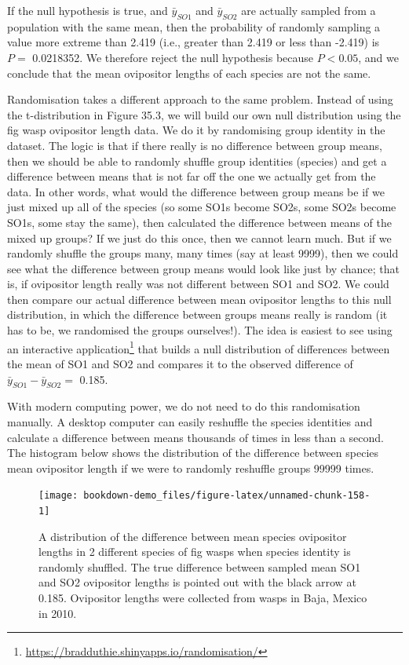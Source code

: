 \documentclass[
  openany]{krantz}
\begin{document}
If the null hypothesis is true, and \(\bar{y}_{SO1}\) and \(\bar{y}_{SO2}\) are actually sampled from a population with the same mean, then the probability of randomly sampling a value more extreme than 2.419 (i.e., greater than 2.419 or less than -2.419) is \(P =\) 0.0218352.
We therefore reject the null hypothesis because \(P < 0.05\), and we conclude that the mean ovipositor lengths of each species are not the same.

Randomisation takes a different approach to the same problem.
Instead of using the t-distribution in Figure 35.3, we will build our own null distribution using the fig wasp ovipositor length data.
We do it by randomising group identity in the dataset.
The logic is that if there really is no difference between group means, then we should be able to randomly shuffle group identities (species) and get a difference between means that is not far off the one we actually get from the data.
In other words, what would the difference between group means be if we just mixed up all of the species (so some SO1s become SO2s, some SO2s become SO1s, some stay the same), then calculated the difference between means of the mixed up groups?
If we just do this once, then we cannot learn much.
But if we randomly shuffle the groups many, many times (say at least 9999), then we could see what the difference between group means would look like just by chance; that is, if ovipositor length really was not different between SO1 and SO2.
We could then compare our actual difference between mean ovipositor lengths to this null distribution, in which the difference between groups means really is random (it has to be, we randomised the groups ourselves!).
The idea is easiest to see using an interactive application\footnote{\url{https://bradduthie.shinyapps.io/randomisation/}} that builds a null distribution of differences between the mean of SO1 and SO2 and compares it to the observed difference of \(\bar{y}_{SO1} - \bar{y}_{SO2} =\) 0.185.

With modern computing power, we do not need to do this randomisation manually.
A desktop computer can easily reshuffle the species identities and calculate a difference between means thousands of times in less than a second.
The histogram below shows the distribution of the difference between species mean ovipositor length if we were to randomly reshuffle groups 99999 times.

\begin{figure}
\texttt{[image: bookdown-demo\_files/figure-latex/unnamed-chunk-158-1]} \caption{A distribution of the difference between mean species ovipositor lengths in 2 different species of fig wasps when species identity is randomly shuffled. The true difference between sampled mean SO1 and SO2 ovipositor lengths is pointed out with the black arrow at 0.185. Ovipositor lengths were collected from wasps in Baja, Mexico in 2010.}\label{fig:unnamed-chunk-158}
\end{figure}
\end{document}
